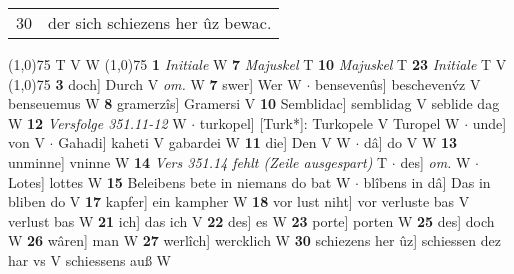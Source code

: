 \documentclass[8pt,a4paper,notitlepage]{article}
\begin{document}
\begin{table}[ht]
\begin{minipage}[t]{0.5\linewidth}
\begin{tabular}{rl}
30 & der sich schiezens her ûz bewac.\\ 
\end{tabular}
\scriptsize
\line(1,0){75} \newline
T V W \newline
\line(1,0){75} \newline
\textbf{1} \textit{Initiale} W  \textbf{7} \textit{Majuskel} T  \textbf{10} \textit{Majuskel} T  \textbf{23} \textit{Initiale} T V  \newline
\line(1,0){75} \newline
\textbf{3} doch] Durch V \textit{om.} W \textbf{7} swer] Wer W  $\cdot$ bensevenûs] beschevenv́z V benseuemus W \textbf{8} gramerzîs] Gramersi V \textbf{10} Semblidac] semblidag V seblide dag W \textbf{12} \textit{Versfolge 351.11-12} W   $\cdot$ turkopel] [Turk*]: Turkopele V Turopel W  $\cdot$ unde] von V  $\cdot$ Gahadi] kaheti V gabardei W \textbf{11} die] Den V W  $\cdot$ dâ] do V W \textbf{13} unminne] vninne W \textbf{14} \textit{Vers 351.14 fehlt (Zeile ausgespart)} T   $\cdot$ des] \textit{om.} W  $\cdot$ Lotes] lottes W \textbf{15} Beleibens bete in niemans do bat W  $\cdot$ blîbens in dâ] Das in bliben do V \textbf{17} kapfer] ein kampher W \textbf{18} vor lust niht] vor verluste bas V verlust bas W \textbf{21} ich] das ich V \textbf{22} des] es W \textbf{23} porte] porten W \textbf{25} des] doch W \textbf{26} wâren] man W \textbf{27} werlîch] wercklich W \textbf{30} schiezens her ûz] schiessen dez har vs V schiessens auß W \newline
\end{minipage}
\end{table}
\end{document}
